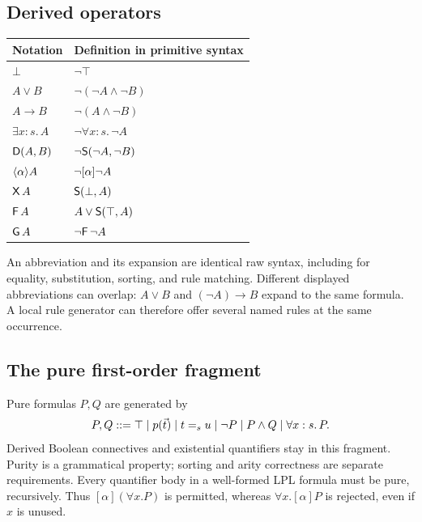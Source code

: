 \subsection{Derived operators}
\begin{center}
\begin{tabular}{@{}ll@{}}
\toprule
Notation & Definition in primitive syntax\\
\midrule
$\bot$ & $\neg\top$\\
$A\lor B$ & $\neg(\neg A\land\neg B)$\\
$A\to B$ & $\neg(A\land\neg B)$\\
$\exists x:s.\,A$ & $\neg\forall x:s.\,\neg A$\\
$\mathsf{D}(A,B)$ & $\neg\mathsf{S}(\neg A,\neg B)$\\
$\langle\alpha\rangle A$ & $\neg[\alpha]\neg A$\\
$\mathsf{X}\,A$ & $\mathsf{S}(\bot,A)$\\
$\mathsf{F}\,A$ & $A\lor\mathsf{S}(\top,A)$\\
$\mathsf{G}\,A$ & $\neg\mathsf{F}\,\neg A$\\
\bottomrule
\end{tabular}
\end{center}

An abbreviation and its expansion are identical raw syntax, including for
equality, substitution, sorting, and rule matching. Different displayed
abbreviations can overlap: $A\lor B$ and $(\neg A)\to B$ expand to the same
formula. A local rule generator can therefore offer several named rules at
the same occurrence.

\subsection{The pure first-order fragment}
Pure formulas $P,Q$ are generated by
\[
 P,Q\mathrel{::=}\top\mid p(\vec t)\mid t=_s u\mid\neg P
       \mid P\land Q\mid\forall x:s.\,P.
\]
Derived Boolean connectives and existential quantifiers stay in this fragment.
Purity is a grammatical property; sorting and arity correctness are separate
requirements. Every quantifier body in a well-formed LPL formula must be pure,
recursively. Thus $[\alpha](\forall x.P)$ is permitted, whereas
$\forall x.[\alpha]P$ is rejected, even if $x$ is unused.

